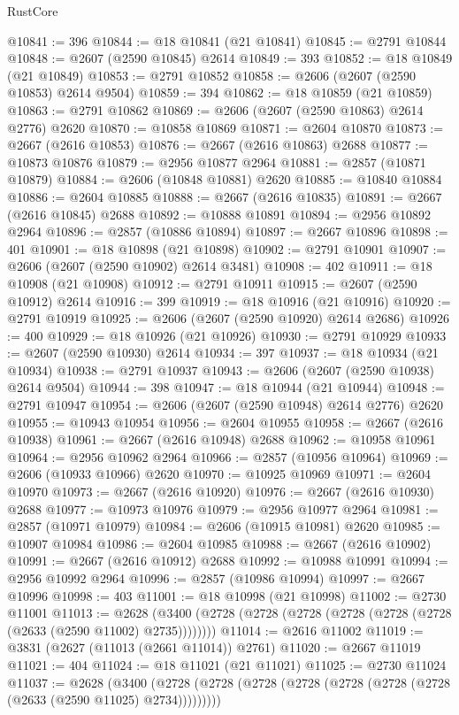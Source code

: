 \begin{lexlean}{RustCore}
\begin{coremodule}
@10841 := 396
@10844 := @18 @10841 (@21 @10841)
@10845 := @2791 @10844
@10848 := @2607 (@2590 @10845) @2614
@10849 := 393
@10852 := @18 @10849 (@21 @10849)
@10853 := @2791 @10852
@10858 := @2606 (@2607 (@2590 @10853) @2614 @9504)
@10859 := 394
@10862 := @18 @10859 (@21 @10859)
@10863 := @2791 @10862
@10869 := @2606 (@2607 (@2590 @10863) @2614 @2776) @2620
@10870 := @10858 @10869
@10871 := @2604 @10870
@10873 := @2667 (@2616 @10853)
@10876 := @2667 (@2616 @10863) @2688
@10877 := @10873 @10876
@10879 := @2956 @10877 @2964
@10881 := @2857 (@10871 @10879)
@10884 := @2606 (@10848 @10881) @2620
@10885 := @10840 @10884
@10886 := @2604 @10885
@10888 := @2667 (@2616 @10835)
@10891 := @2667 (@2616 @10845) @2688
@10892 := @10888 @10891
@10894 := @2956 @10892 @2964
@10896 := @2857 (@10886 @10894)
@10897 := @2667 @10896
@10898 := 401
@10901 := @18 @10898 (@21 @10898)
@10902 := @2791 @10901
@10907 := @2606 (@2607 (@2590 @10902) @2614 @3481)
@10908 := 402
@10911 := @18 @10908 (@21 @10908)
@10912 := @2791 @10911
@10915 := @2607 (@2590 @10912) @2614
@10916 := 399
@10919 := @18 @10916 (@21 @10916)
@10920 := @2791 @10919
@10925 := @2606 (@2607 (@2590 @10920) @2614 @2686)
@10926 := 400
@10929 := @18 @10926 (@21 @10926)
@10930 := @2791 @10929
@10933 := @2607 (@2590 @10930) @2614
@10934 := 397
@10937 := @18 @10934 (@21 @10934)
@10938 := @2791 @10937
@10943 := @2606 (@2607 (@2590 @10938) @2614 @9504)
@10944 := 398
@10947 := @18 @10944 (@21 @10944)
@10948 := @2791 @10947
@10954 := @2606 (@2607 (@2590 @10948) @2614 @2776) @2620
@10955 := @10943 @10954
@10956 := @2604 @10955
@10958 := @2667 (@2616 @10938)
@10961 := @2667 (@2616 @10948) @2688
@10962 := @10958 @10961
@10964 := @2956 @10962 @2964
@10966 := @2857 (@10956 @10964)
@10969 := @2606 (@10933 @10966) @2620
@10970 := @10925 @10969
@10971 := @2604 @10970
@10973 := @2667 (@2616 @10920)
@10976 := @2667 (@2616 @10930) @2688
@10977 := @10973 @10976
@10979 := @2956 @10977 @2964
@10981 := @2857 (@10971 @10979)
@10984 := @2606 (@10915 @10981) @2620
@10985 := @10907 @10984
@10986 := @2604 @10985
@10988 := @2667 (@2616 @10902)
@10991 := @2667 (@2616 @10912) @2688
@10992 := @10988 @10991
@10994 := @2956 @10992 @2964
@10996 := @2857 (@10986 @10994)
@10997 := @2667 @10996
@10998 := 403
@11001 := @18 @10998 (@21 @10998)
@11002 := @2730 @11001
@11013 := @2628 (@3400 (@2728 (@2728 (@2728 (@2728 (@2728 (@2728 (@2633 (@2590 @11002) @2735))))))))
@11014 := @2616 @11002
@11019 := @3831 (@2627 (@11013 (@2661 @11014)) @2761)
@11020 := @2667 @11019
@11021 := 404
@11024 := @18 @11021 (@21 @11021)
@11025 := @2730 @11024
@11037 := @2628
    (@3400 (@2728 (@2728 (@2728 (@2728 (@2728 (@2728 (@2728 (@2633 (@2590 @11025) @2734)))))))))

\end{coremodule}
\end{lexlean}
